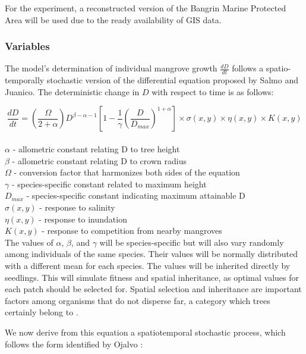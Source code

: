 For the experiment, a reconstructed version of the Bangrin Marine Protected Area will be used due to the ready availability of GIS data.

\subsubsection{Variables}
The model's determination of individual mangrove growth $\frac{dD}{dt}$ follows a spatio-temporally stochastic version of the differential equation proposed by Salmo and Juanico. The deterministic change in $D$ with respect to time is as follows:

\begin{equation}
	\frac{dD}{dt} = \left(\frac{\Omega}{2 + \alpha}\right)D^{\beta - \alpha - 1} \left[1 - \frac{1}{\gamma}\left(\frac{D}{D_{max}}\right)^{1 + \alpha}\right] \times \sigma(x,y) \times \eta(x,y) \times K(x,y)
\end{equation}\\
$\alpha$ - allometric constant relating D to tree height\\
$\beta$ - allometric constant relating D to crown radius\\
$\Omega$ - conversion factor that harmonizes both sides of the equation\\
$\gamma$ - species-specific constant related to maximum height\\
$D_{max}$ - species-specific constant indicating maximum attainable D\\
$\sigma(x,y)$ - response to salinity\\
$\eta(x,y)$ - response to inundation\\
$K(x,y)$ - response to competition from nearby mangroves\\

The values of $\alpha$, $\beta$, and $\gamma$ will be species-specific but will also vary randomly among individuals of the same species. Their values will be normally distributed with a different mean for each species. The values will be inherited directly by seedlings. This will simulate fitness and spatial inheritance, as optimal values for each patch should be selected for. Spatial selection and inheritance are important factors among organisms that do not disperse far, a category which trees certainly belong to \cite{spatialInheritance}. 

We now derive from this equation a spatiotemporal stochastic process, which follows the form identified by Ojalvo \cite{ojalvoColoredNoise}:

